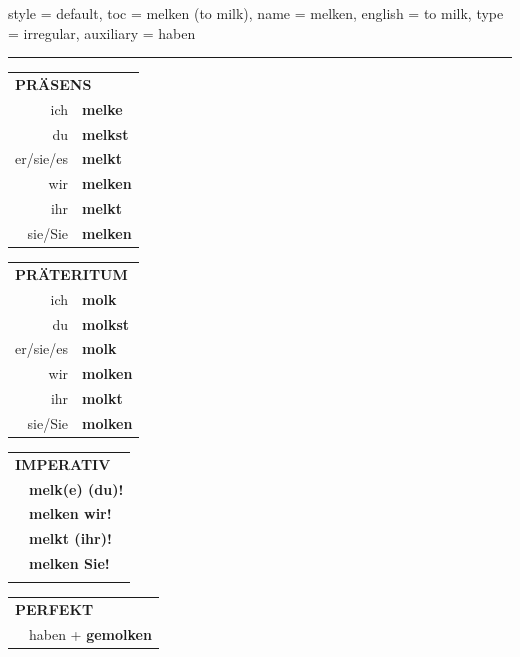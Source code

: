 \begin{verbentry}{
  style = {default},
  toc = {melken (to milk)},
  name = {melken},
  english = {to milk},
  type = {irregular},
  auxiliary = {haben}
}
 
    
     \vspace{5pt}

    \hrule
    
    \vspace{5pt}

  \begin{tabular}{rl}
     \multicolumn{2}{l}{\textbf{PRÄSENS} }\\
    ich & \textbf{melke}\\
    du & \textbf{melkst}\\
    er/sie/es & \textbf{melkt}\\
    wir & \textbf{melken}\\
    ihr & \textbf{melkt}\\
    sie/Sie & \textbf{melken}\\
  \end{tabular}
  \hfill
     \begin{tabular}{rl}
    \multicolumn{2}{l}{\textbf{PRÄTERITUM} }\\
    ich & \textbf{molk}\\
    du & \textbf{molkst}\\
    er/sie/es & \textbf{molk}\\
    wir & \textbf{molken}\\
    ihr & \textbf{molkt}\\
    sie/Sie & \textbf{molken}\\
  \end{tabular}
  \hfill
  \begin{tabular}{rl}
     \multicolumn{2}{l}{\textbf{IMPERATIV} }\\
   & \textbf{melk(e) (du)!}\\
   & \textbf{melken wir!}\\
   & \textbf{melkt (ihr)!}\\
   & \textbf{melken Sie!}\\
   & \vspace{10pt}
  \end{tabular}

    \vspace{10pt}

 \begin{tabular}{rl}
     \multicolumn{2}{l}{\textbf{PERFEKT}}\\
   & haben + \textbf{gemolken}\\
  \end{tabular}
\hfill
   \begin{tabular}{rl}
   

\end{tabular}
\end{verbentry}
